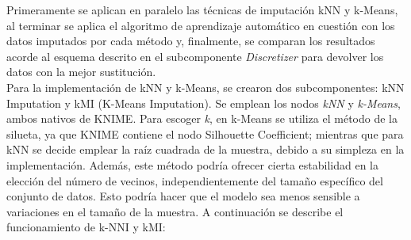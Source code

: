 Primeramente se aplican en paralelo las técnicas de imputación kNN y k-Means, al terminar se aplica el algoritmo de aprendizaje automático en cuestión con los datos imputados por cada método y, finalmente, se comparan los resultados acorde al esquema descrito en el subcomponente \textit{Discretizer} para devolver los datos con la mejor sustitución. \\
Para la implementación de kNN y k-Means, se crearon dos subcomponentes: kNN Imputation y kMI (K-Means Imputation). Se emplean los nodos \textit{kNN} y \textit{k-Means}, ambos nativos de KNIME. Para escoger \textit{k}, en k-Means se utiliza el método de la silueta, ya que KNIME contiene el nodo Silhouette Coefficient; mientras que para kNN se decide emplear la raíz cuadrada de la muestra, debido a su simpleza en la implementación. Además, este método podría ofrecer cierta estabilidad en la elección del número de vecinos, independientemente del tamaño específico del conjunto de datos. Esto podría hacer que el modelo sea menos sensible a variaciones en el tamaño de la muestra. A continuación se describe el funcionamiento de k-NNI y kMI:

